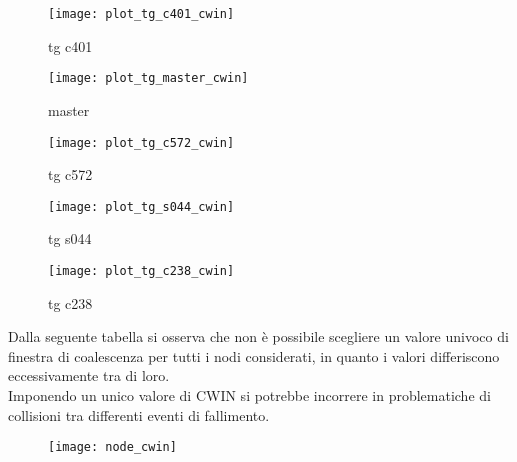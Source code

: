 \begin{minipage}{\linewidth}
  \centering
  \begin{minipage}{0.49\linewidth}
    \begin{figure}[H]
      \texttt{[image: plot\_tg\_c401\_cwin]}
      \caption*{tg c401}
    \end{figure}
  \end{minipage}
  \begin{minipage}{0.49\linewidth}
    \begin{figure}[H]
      \texttt{[image: plot\_tg\_master\_cwin]}
      \caption*{master}
    \end{figure}
  \end{minipage}
  \begin{minipage}{0.49\linewidth}
    \begin{figure}[H]
      \texttt{[image: plot\_tg\_c572\_cwin]}
      \caption*{tg c572}
    \end{figure}
  \end{minipage}
  \begin{minipage}{0.49\linewidth}
    \begin{figure}[H]
      \texttt{[image: plot\_tg\_s044\_cwin]}
      \caption*{tg s044}
    \end{figure}
  \end{minipage}
  \begin{minipage}{0.49\linewidth}
    \hspace{0.25\linewidth}
    \begin{figure}[H]
      \texttt{[image: plot\_tg\_c238\_cwin]}
      \caption*{tg c238}
    \end{figure}
  \end{minipage}
\end{minipage}
\label{cwin_5_nodi}

\clearpage

Dalla seguente tabella si osserva che non è possibile scegliere un
valore univoco di finestra di coalescenza per tutti i nodi considerati, in quanto
i valori differiscono eccessivamente tra di loro.\\
Imponendo un unico valore di CWIN si potrebbe incorrere in problematiche di
collisioni tra differenti eventi di fallimento.\\

\begin{figure}[!htbp]
  \centering
  \texttt{[image: node\_cwin]}
\end{figure}

